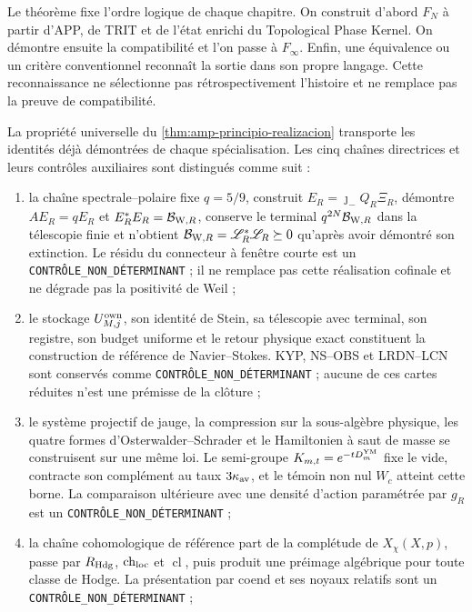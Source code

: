 Le théorème fixe l'ordre logique de chaque chapitre. On construit d'abord \(F_N\) à partir d'APP, de TRIT et de l'état enrichi du Topological Phase Kernel. On démontre ensuite la compatibilité et l'on passe à \(F_\infty\). Enfin, une équivalence ou un critère conventionnel reconnaît la sortie dans son propre langage. Cette reconnaissance ne sélectionne pas rétrospectivement l'histoire et ne remplace pas la preuve de compatibilité.

\begin{proposition}
\label{prop:amp-alcance-cinco-realizadores}
La propriété universelle du \cref{thm:amp-principio-realizacion} transporte les identités déjà démontrées de chaque spécialisation. Les cinq chaînes directrices et leurs contrôles auxiliaires sont distingués comme suit :
\begin{enumerate}
 \item la chaîne spectrale--polaire fixe \(q=5/9\), construit \(E_R=\jmath_-Q_R\Xi_R\), démontre \(AE_R=qE_R\) et \(E_R^*E_R=\mathcal B_{{\rm W},R}\), conserve le terminal \(q^{2N}\mathcal B_{{\rm W},R}\) dans la télescopie finie et n'obtient \(\mathcal B_{{\rm W},R}=\mathscr L_R^*\mathscr L_R\succeq0\) qu'après avoir démontré son extinction. Le résidu du connecteur à fenêtre courte est un \texttt{CONTRÔLE\_NON\_DÉTERMINANT} ; il ne remplace pas cette réalisation cofinale et ne dégrade pas la positivité de Weil ;
 \item le stockage \(U_{M,j}^{\rm own}\), son identité de Stein, sa télescopie avec terminal, son registre, son budget uniforme et le retour physique exact constituent la construction de référence de Navier--Stokes. KYP, NS--OBS et LRDN--LCN sont conservés comme \texttt{CONTRÔLE\_NON\_DÉTERMINANT} ; aucune de ces cartes réduites n'est une prémisse de la clôture ;
 \item le système projectif de jauge, la compression sur la sous-algèbre physique, les quatre formes d'Osterwalder--Schrader et le Hamiltonien à saut de masse se construisent sur une même loi. Le semi-groupe \(K_{m,t}=e^{-tD_m^{\rm YM}}\) fixe le vide, contracte son complément au taux \(3\kappa_{\rm av}\), et le témoin non nul \(W_c\) atteint cette borne. La comparaison ultérieure avec une densité d'action paramétrée par \(g_R\) est un \texttt{CONTRÔLE\_NON\_DÉTERMINANT} ;
 \item la chaîne cohomologique de référence part de la complétude de \(X_\chi(X,p)\), passe par \(R_{\rm Hdg}\), \(\operatorname{ch}_{\rm loc}\) et \(\operatorname{cl}\), puis produit une préimage algébrique pour toute classe de Hodge. La présentation par coend et ses noyaux relatifs sont un \texttt{CONTRÔLE\_NON\_DÉTERMINANT} ;

\end{enumerate}
\end{proposition}
